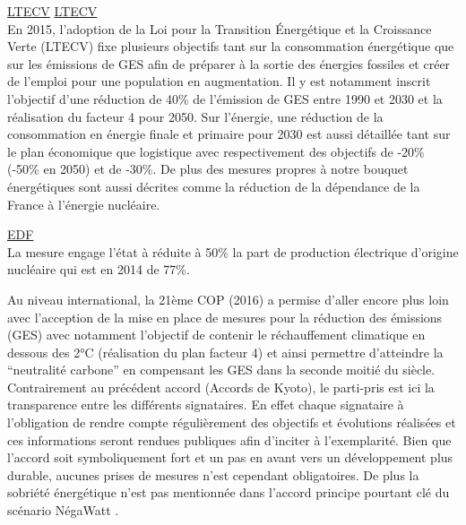 \href{http://www.ecologique-solidaire.gouv.fr/loi-transition-energetique-croissance-verte}{LTECV}
\href{https://www.legifrance.gouv.fr/affichTexte.do?cidTexte=LEGITEXT000031742863&dateTexte=20170606}{LTECV}\\
En 2015, l’adoption de la Loi pour la Transition Énergétique et la Croissance
Verte (LTECV) fixe plusieurs objectifs tant sur la consommation énergétique
que sur les émissions de GES afin de préparer à la sortie des énergies fossiles
et créer de l’emploi pour une population en augmentation. Il y est notamment inscrit
l’objectif d’une réduction de 40\% de l’émission de GES entre 1990 et 2030 et la
réalisation du facteur 4 pour 2050. Sur l’énergie, une réduction de la consommation
en énergie finale et primaire pour 2030 est aussi détaillée tant sur le plan économique
que logistique avec respectivement des objectifs de -20\% (-50\% en 2050) et de -30\%.
De plus des mesures propres à notre bouquet énergétiques sont aussi décrites comme
la réduction de la dépendance de la France à l’énergie nucléaire.

\href{https://www.edf.fr/groupe-edf/espaces-dedies/l-energie-de-a-a-z/tout-sur-l-energie/produire-de-l-electricite/le-nucleaire-en-chiffres}{EDF}\\
La mesure engage l’état à réduite à 50\% la part de production électrique d’origine nucléaire
qui est en 2014 de 77\%.


Au niveau international, la 21ème COP (2016) a permise d’aller encore plus loin avec l’acception de la mise en place
de mesures pour la réduction des émissions (GES) avec notamment l’objectif
de contenir le réchauffement climatique en dessous des 2°C (réalisation du plan facteur 4) et ainsi permettre
d’atteindre la \enquote{neutralité carbone} en compensant les GES dans la seconde moitié
du siècle. Contrairement au précédent accord (Accords de Kyoto), le parti-pris est ici
la transparence entre les différents signataires. En effet chaque signataire à l’obligation de rendre
compte régulièrement des objectifs et évolutions réalisées et ces informations seront
rendues publiques afin d’inciter à l’exemplarité. Bien que l’accord soit symboliquement
fort et un pas en avant vers un développement plus durable, aucunes prises de mesures
n’est cependant obligatoires. De plus la sobriété énergétique n’est pas mentionnée dans l’accord
principe pourtant clé du scénario NégaWatt \parencite{Salomon2012}.

